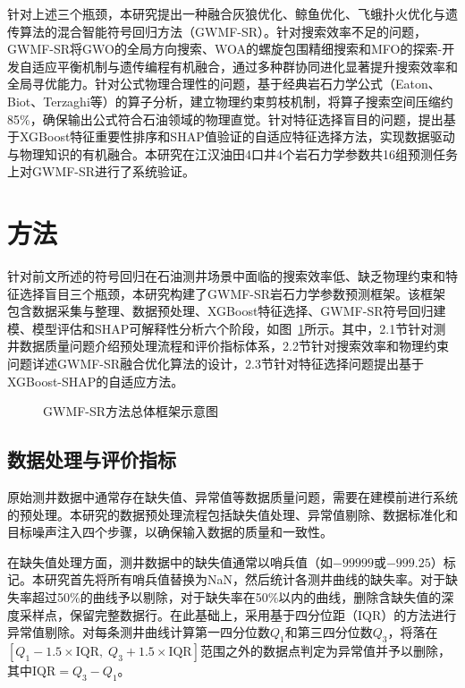 \documentclass[a4paper,12pt]{ctexart}
\begin{document}
针对上述三个瓶颈，本研究提出一种融合灰狼优化、鲸鱼优化、飞蛾扑火优化与遗传算法的混合智能符号回归方法（GWMF-SR）。针对搜索效率不足的问题，GWMF-SR将GWO的全局方向搜索、WOA的螺旋包围精细搜索和MFO的探索-开发自适应平衡机制与遗传编程有机融合，通过多种群协同进化显著提升搜索效率和全局寻优能力。针对公式物理合理性的问题，基于经典岩石力学公式（Eaton、Biot、Terzaghi等）的算子分析，建立物理约束剪枝机制，将算子搜索空间压缩约85\%，确保输出公式符合石油领域的物理直觉。针对特征选择盲目的问题，提出基于XGBoost特征重要性排序和SHAP值验证的自适应特征选择方法，实现数据驱动与物理知识的有机融合。本研究在江汉油田4口井4个岩石力学参数共16组预测任务上对GWMF-SR进行了系统验证。

\section{方法}

针对前文所述的符号回归在石油测井场景中面临的搜索效率低、缺乏物理约束和特征选择盲目三个瓶颈，本研究构建了GWMF-SR岩石力学参数预测框架。该框架包含数据采集与整理、数据预处理、XGBoost特征选择、GWMF-SR符号回归建模、模型评估和SHAP可解释性分析六个阶段，如图~\ref{fig:framework}所示。其中，2.1节针对测井数据质量问题介绍预处理流程和评价指标体系，2.2节针对搜索效率和物理约束问题详述GWMF-SR融合优化算法的设计，2.3节针对特征选择问题提出基于XGBoost-SHAP的自适应方法。

\begin{figure}[htbp]
\centering
{}
\caption{GWMF-SR方法总体框架示意图}
\label{fig:framework}
\end{figure}

\subsection{数据处理与评价指标}

原始测井数据中通常存在缺失值、异常值等数据质量问题，需要在建模前进行系统的预处理。本研究的数据预处理流程包括缺失值处理、异常值剔除、数据标准化和目标噪声注入四个步骤，以确保输入数据的质量和一致性。

在缺失值处理方面，测井数据中的缺失值通常以哨兵值（如$-99999$或$-999.25$）标记。本研究首先将所有哨兵值替换为NaN，然后统计各测井曲线的缺失率。对于缺失率超过50\%的曲线予以剔除，对于缺失率在50\%以内的曲线，删除含缺失值的深度采样点，保留完整数据行。在此基础上，采用基于四分位距（IQR）的方法进行异常值剔除。对每条测井曲线计算第一四分位数$Q_1$和第三四分位数$Q_3$，将落在$[Q_1 - 1.5 \times \text{IQR},\; Q_3 + 1.5 \times \text{IQR}]$范围之外的数据点判定为异常值并予以删除，其中$\text{IQR} = Q_3 - Q_1$。
\end{document}
